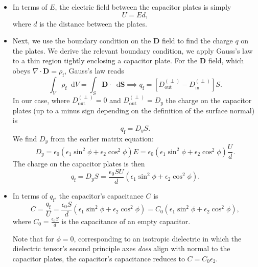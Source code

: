 \documentclass[11pt, a4paper]{article}
\newcommand{\diff}{\mathop{}\!\mathrm{d}} %
\renewcommand{\vec}[1]{\bm{#1}} %
\newcommand{\D}{\vec{D}}  %
\newcommand{\e}{\epsilon}
\newcommand{\ee}{\epsilon_{0}}  %
\renewcommand{\div}{\nabla \cdot}
\begin{document}
\begin{itemize}
	\item In terms of $ E $, the electric field between the capacitor plates is simply
	\begin{equation*}
		U = Ed,
	\end{equation*}
	where $ d $ is the distance between the plates. 
			
	\item Next, we use the boundary condition on the $ \D $ field to find the charge $ q $ on the plates. We derive the relevant boundary condition, we apply Gauss's law to a thin region tightly enclosing a capacitor plate. For the $ \D $ field, which obeys $ \div \D = \rho_{\text{f}} $, Gauss's law reads
	\begin{equation*}
		\int_{V} \rho_{\text{f}} \diff V = \int_{S} \D \cdot \diff \vec{S} \implies q_{\text{f}} = \left[D_{\text{out}}^{(\perp)} - D_{\text{in}}^{(\perp)} \right] S.
	\end{equation*}
	In our case, where $ D_{\text{out}}^{(\perp)} = 0 $ and $ D_{\text{out}}^{(\perp)} = D_{y} $ the charge on the capacitor plates (up to a minus sign depending on the definition of the surface normal) is
	\begin{equation*}
		q_{\text{f}} = D_{y} S.
	\end{equation*}	
	We find $ D_{y} $ from the earlier matrix equation:
	\begin{equation*}
		D_{y} = \ee \left( \e_{1} \sin^{2}\phi + \e_{2} \cos^{2}\phi \right) E = \ee \left( \e_{1} \sin^{2}\phi + \e_{2} \cos^{2}\phi \right) \frac{U}{d}.
	\end{equation*}
	The charge on the capacitor plates is then
	\begin{equation*}
		q_{\text{f}} = D_{y} S = \frac{\ee SU}{d} \left( \e_{1} \sin^{2}\phi + \e_{2} \cos^{2}\phi \right) .
	\end{equation*}
	
	\item In terms of $ q_{\text{f}} $, the capacitor's capacitance $ C $ is
	\begin{equation*}
		C = \frac{q_{\text{f}}}{U} = \frac{\ee S}{d}\left(\e_{1} \sin^{2}\phi + \e_{2} \cos^{2}\phi\right) = C_{0}\left(\e_{1} \sin^{2}\phi + \e_{2} \cos^{2}\phi\right),
	\end{equation*}
	where $ C_{0} =  \frac{\ee S}{d} $ is the capacitance of an empty capacitor. 
	
	Note that for $ \phi = 0 $, corresponding to an isotropic dielectric in which the dielectric tensor's second principle axes \textit{does} align with normal to the capacitor plates, the capacitor's capacitance reduces to $ C = C_{0}\e_{2} $. 
\end{itemize}
\end{document}

